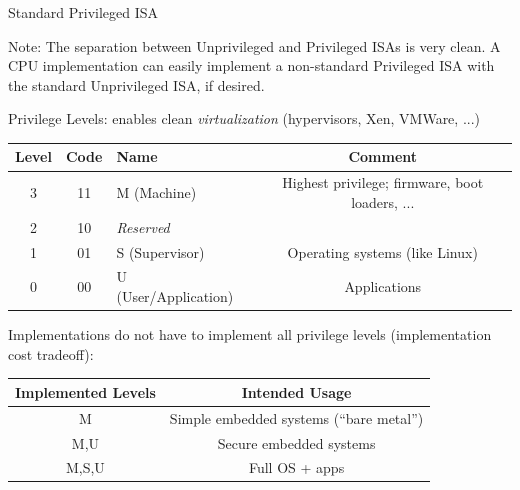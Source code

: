 \documentclass{article}
\newcommand{\hmm}{\hspace*{2em}}
\begin{document}
\begin{center}
  {\Huge
    Standard Privileged ISA}

  \vspace*{0.5in}

  \begin{minipage}{9in}\LARGE
    {\Large Note: The separation between Unprivileged and Privileged ISAs is very
    clean.  A CPU implementation can easily implement a non-standard
    Privileged ISA with the standard Unprivileged ISA, if desired.}

    \vspace{0.5in}

    Privilege Levels: enables clean \emph{virtualization} (hypervisors, Xen, VMWare, ...)

    \begin{center}
      \begin{tabular}{|c|c|l|c|}
        \hline
        Level & Code & Name                 & Comment \\
        \hline
        3     & 11   & M (Machine)          & Highest privilege; firmware, boot loaders, ... \\
        2     & 10   & \hmm \emph{Reserved} & \\
        1     & 01   & S (Supervisor)       & Operating systems (like Linux) \\
        0     & 00   & U (User/Application) & Applications \\
        \hline
      \end{tabular}
    \end{center}

    \vspace{0.5in}

    Implementations do not have to implement all privilege levels
    (implementation cost tradeoff):

    \begin{center}
      \begin{tabular}{|c|c|}
        \hline
        Implemented Levels & Intended Usage \\
        \hline
        M                  &   Simple embedded systems (``bare metal'') \\
        M,U                &   Secure embedded systems \\
        M,S,U              &   Full OS + apps \\
        \hline
      \end{tabular}
    \end{center}
  \end{minipage}

\end{center}
\end{document}
